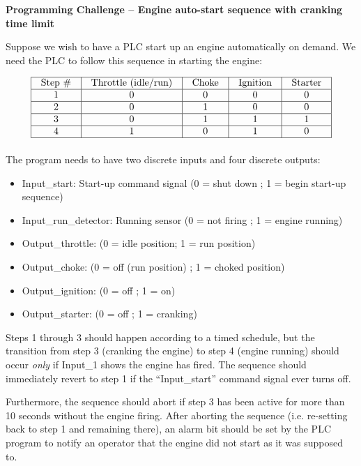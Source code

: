 \documentclass[12pt,a4paper]{article}
\begin{document}
\noindent
{\bf Programming Challenge -- Engine auto-start sequence with cranking time limit}

\vskip 10pt

Suppose we wish to have a PLC start up an engine automatically on demand.  We need the PLC to follow this sequence in starting the engine:


$$\vbox{\offinterlineskip
\halign{\strut
\vrule \quad\hfil # \ \hfil & 
\vrule \quad\hfil # \ \hfil & 
\vrule \quad\hfil # \ \hfil & 
\vrule \quad\hfil # \ \hfil & 
\vrule \quad\hfil # \ \hfil \vrule \cr
\noalign{\hrule}
%
Step \# & Throttle (idle/run) & Choke & Ignition & Starter \cr
%
\noalign{\hrule}
%
1 & 0 & 0 & 0 & 0 \cr
%
\noalign{\hrule}
%
2 & 0 & 1 & 0 & 0 \cr
%
\noalign{\hrule}
%
3 & 0 & 1 & 1 & 1 \cr
%
\noalign{\hrule}
%
4 & 1 & 0 & 1 & 0 \cr
%
\noalign{\hrule}
} %
}$$ %

The program needs to have two discrete inputs and four discrete outputs:

\begin{itemize}
\item{} Input\_start: Start-up command signal (0 = shut down ; 1 = begin start-up sequence)
\item{} Input\_run\_detector: Running sensor (0 = not firing ; 1 = engine running)
\vskip 5pt
\item{} Output\_throttle: (0 = idle position; 1 = run position)
\item{} Output\_choke: (0 = off (run position) ; 1 = choked position)
\item{} Output\_ignition: (0 = off ; 1 = on)
\item{} Output\_starter: (0 = off ; 1 = cranking)
\end{itemize}

Steps 1 through 3 should happen according to a timed schedule, but the transition from step 3 (cranking the engine) to step 4 (engine running) should occur {\it only} if Input\_1 shows the engine has fired.  The sequence should immediately revert to step 1 if the ``Input\_start'' command signal ever turns off.  

Furthermore, the sequence should abort if step 3 has been active for more than 10 seconds without the engine firing.  After aborting the sequence (i.e. re-setting back to step 1 and remaining there), an alarm bit should be set by the PLC program to notify an operator that the engine did not start as it was supposed to.
\end{document}

